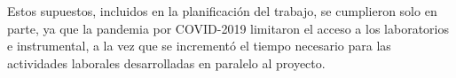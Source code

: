 Estos supuestos, incluidos en la planificación del trabajo, se cumplieron solo en parte, ya que la pandemia por COVID-2019 limitaron el acceso a los laboratorios e instrumental, a la vez que se incrementó el tiempo necesario para las actividades laborales desarrolladas en paralelo al proyecto. 






